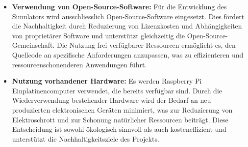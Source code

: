 \documentclass[../../main.tex]{subfiles} %
\begin{document}
\begin{itemize}
      \item \textbf{Verwendung von Open-Source-Software:} Für die
            Entwicklung des Simulators wird ausschliesslich
            Open-Source-Software eingesetzt. Dies fördert die Nachhaltigkeit
            durch Reduzierung von Lizenzkosten und Abhängigkeiten von
            proprietärer Software und unterstützt gleichzeitig die
            Open-Source-Gemeinschaft. Die Nutzung frei verfügbarer Ressourcen
            ermöglicht es, den Quellcode an spezifische Anforderungen
            anzupassen, was zu effizienteren und ressourcenschonenderen
            Anwendungen führt.

      \item \textbf{Nutzung vorhandener Hardware:} Es werden Raspberry Pi
            Einplatinencomputer verwendet, die bereits verfügbar sind. Durch
            die Wiederverwendung bestehender Hardware wird der Bedarf an neu
            produzierten elektronischen Geräten minimiert, was zur
            Reduzierung von Elektroschrott und zur Schonung natürlicher
            Ressourcen beiträgt. Diese Entscheidung ist sowohl ökologisch
            sinnvoll als auch kosteneffizient und unterstützt die
            Nachhaltigkeitsziele des Projekts.
\end{itemize}
\end{document}
